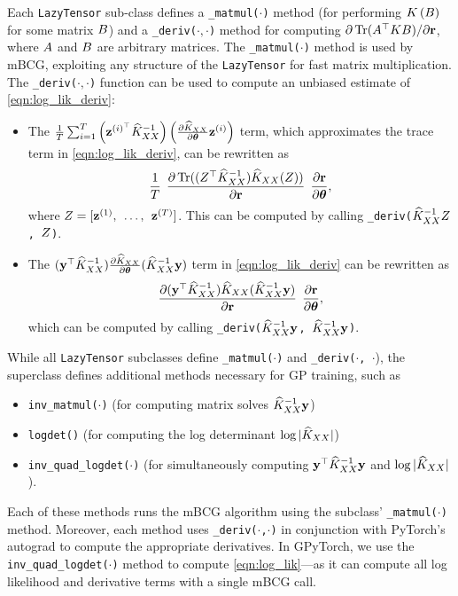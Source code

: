Each {\tt LazyTensor} sub-class defines a {\tt \_matmul($\cdot$)} method (for performing $K \left( B \right)$ for some matrix $B$) and a {\tt \_deriv($\cdot,\cdot$)} method for computing $\partial \tr{ \bA^\top \bK \bB }/{\partial \br}$,
where $A$ and $B$ are arbitrary matrices.
The {\tt \_matmul($\cdot$)} method is used by mBCG, exploiting any structure of the {\tt LazyTensor} for fast matrix multiplication.
The {\tt \_deriv($\cdot,\cdot$)} function can be used to compute an unbiased estimate of \cref{eqn:log_lik_deriv}:
\begin{itemize}
  \item The $\frac{1}{T}\sum_{i=1}^{T}\left(\mathbf{z}^{(i)^\top} \widehat{K}_{XX}^{-1}\right)\left(\frac{\partial \widehat{K}_{XX}}{\partial \boldsymbol{\theta}}\mathbf{z}^{(i)} \right)$ term,
    which approximates the trace term in \cref{eqn:log_lik_deriv},
    can be rewritten as
    \[
      \frac{1}{T} \:\: \frac{ \partial \tr{ (\bZ^\top \trainK^{-1}) \trainK (\bZ) }}{ \partial \br } \:\: \frac{ \partial \br }{\partial \btheta},
    \]
    where $Z = [\mathbf{z}^{(1)}, \:\: \ldots, \:\: \mathbf{z}^{(T)}]$.
    This can be computed by calling {\tt \_deriv($\widehat{K}_{XX}^{-1} Z$, $Z$)}.

  \item The $(\mathbf{y}^\top \widehat{K}_{XX}^{-1}) \frac{\partial \widehat{K}_{XX}}{\partial \boldsymbol{\theta}} (\widehat{K}_{XX}^{-1} \mathbf{y})$ term in \cref{eqn:log_lik_deriv}
    can be rewritten as
    \[
      \frac{\partial (\mathbf{y}^\top \widehat{K}_{XX}^{-1}) \widehat{K}_{XX} (\widehat{K}_{XX}^{-1} \mathbf{y}) }{\partial \mathbf{r}} \:\: \frac{\partial \mathbf{r}}{\partial \boldsymbol{\theta}},
    \]
    which can be computed by calling {\tt \_deriv($\widehat{K}_{XX}^{-1} \mathbf{y}$, $\widehat{K}_{XX}^{-1} \mathbf{y}$)}.
\end{itemize}
%
While all {\tt LazyTensor} subclasses define {\tt \_matmul($\cdot$)} and {\tt \_deriv($\cdot$, $\cdot$}),
the superclass defines additional methods necessary for GP training, such as
%
\begin{itemize}
  \item {\tt inv\_matmul($\cdot$)} (for computing matrix solves $\widehat{K}_{XX}^{-1} \mathbf{y}$)
  \item {\tt logdet()} (for computing the log determinant $\log \vert \widehat{K}_{XX} \vert$)
  \item {\tt inv\_quad\_logdet($\cdot$)} (for simultaneously computing $\mathbf{y}^\top \widehat{K}_{XX}^{-1} \mathbf{y}$ and $\log \vert \widehat{K}_{XX} \vert$).
\end{itemize}
%
Each of these methods runs the mBCG algorithm using the subclass' {\tt \_matmul($\cdot$)} method.
Moreover, each method uses {\tt \_deriv($\cdot$,$\cdot$)} in conjunction with PyTorch's autograd \cite{paszke2017automatic} to compute the appropriate derivatives.
In GPyTorch, we use the {\tt inv\_quad\_logdet($\cdot$)} method to compute \cref{eqn:log_lik}---as it can compute all log likelihood and derivative terms with a single mBCG call.


